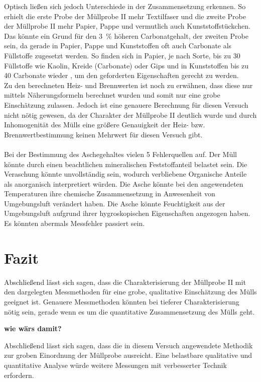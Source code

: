 Optisch ließen sich jedoch Unterschiede in der Zusammensetzung erkennen. So erhielt die erste Probe der Müllprobe II mehr Textilfaser und die zweite Probe der Müllprobe II mehr Papier, Pappe und vermutlich auch Kunststoffstückchen.\linebreak
Das könnte ein Grund für den \SI{3}{\percent} höheren Carbonatgehalt, der zweiten Probe sein, da gerade in Papier, Pappe und Kunststoffen oft auch Carbonate als Füllstoffe zugesetzt werden. So finden sich in Papier, je nach Sorte, bis zu \SI{30}{\mpercent} Füllstoffe wie Kaolin, Kreide (Carbonate) oder Gips \cite{Wikipedia.21.11.2019} und in Kunststoffen bis zu  \SI{40}{\mpercent} Carbonate wieder \cite{PolymerServiceGmbHMerseburg.13.08.2019}, um den geforderten Eigenschaften gerecht zu werden.\\
Zu den berechneten Heiz- und Brennwerten ist noch zu erwähnen, dass diese nur mittels Näherungsformeln berechnet wurden und somit nur eine grobe Einschätzung zulassen. Jedoch ist eine genauere Berechnung für diesen Versuch nicht nötig gewesen, da der Charakter der Müllprobe II deutlich wurde und durch Inhomogenität des Mülls eine größere Genauigkeit der Heiz- bzw. Brennwertbestimmung keinen Mehrwert für diesen Versuch gibt.\\ \\

Bei der Bestimmung des Aschegehaltes vielen 5 Fehlerquellen auf. Der Müll könnte durch einen beachtlichen mineralischen Feststoffanteil belastet sein. Die Veraschung könnte unvollständig sein, wodurch verbliebene Organische Anteile als anorganisch interpretiert würden. Die Asche könnte bei den angewendeten Temperaturen ihre chemische Zusammensetzung in Anwesenheit von Umgebungsluft verändert haben. Die Asche könnte Feuchtigkeit aus der Umgebungsluft aufgrund ihrer hygroskopischen Eigenschaften angezogen haben. Es könnten abermals Messfehler passiert sein. 

\chapter{Fazit}
Abschließend lässt sich sagen, dass die Charakterisierung der Müllprobe II mit den dargelegten Messmethoden für eine grobe, qualitative Einschätzung des Mülls geeignet ist. Genauere Messmethoden könnten bei tieferer Charakterisierung nötig sein, gerade wenn es um die quantitative Zusammensetzung des Mülls geht.

\textbf{wie wärs damit?}

Abschließend lässt sich sagen, dass die in diesem Versuch angewendete Methodik zur groben Einordnung der Müllprobe ausreicht. Eine belastbare qualitative und quantitative Analyse würde weitere Messungen mit verbesserter Technik erfordern.